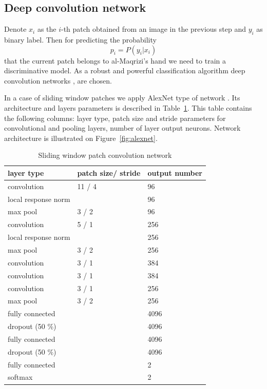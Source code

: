 \documentclass[conference,a4paper]{ieeetran}
\begin{document}
\subsection{Deep convolution network}

Denote $x_i$ as the $i$-th patch obtained from an image in the previous step and $y_i$ as binary label. Then for predicting the probability
\begin{equation*}
	p_i = P(y_i | x_i)
\end{equation*}
that the current patch belongs to al-Maqrizi's hand we need to train a discriminative model. As a robust and powerful classification algorithm deep convolution networks \cite{DL}, \cite{CNN} are chosen. 

In a case of sliding window patches we apply AlexNet type of network \cite{Alexnet}. Its architecture and layers parameters is described in Table~\ref{alexnet_tab}. This table contains the following columns: layer type, patch size and stride parameters for convolutional and pooling layers, number of layer output neurons. Network architecture is illustrated on Figure~\ref{fig:alexnet}. 
\begin{table}[!b]
\centering
\caption{Sliding window patch convolution network}
\label{alexnet_tab}
\begin{tabular}{|l|p{1.3cm}|p{1.3cm}|}
\hline
\textbf{layer type} & \textbf{patch size/ stride} & \textbf{output number}  \\
\hline
convolution & 11 / 4 & 96 \\
\hline
local response norm & & 96 \\
\hline
max pool & 3 / 2 & 96 \\
\hline
convolution & 5 / 1 & 256 \\
\hline
local response norm & & 256 \\
\hline
max pool & 3 / 2 & 256 \\
\hline
convolution & 3 / 1 & 384 \\
\hline
convolution & 3 / 1 & 384 \\
\hline
convolution & 3 / 1 & 256 \\
\hline
max pool & 3 / 2 & 256 \\
\hline
fully connected & & 4096 \\
\hline
dropout (50 \%) & & 4096 \\
\hline
fully connected & & 4096 \\
\hline
dropout (50 \%) & & 4096 \\
\hline
fully connected & & 2 \\
\hline
softmax & & 2 \\
\hline
\end{tabular}
\end{table}
\end{document}
